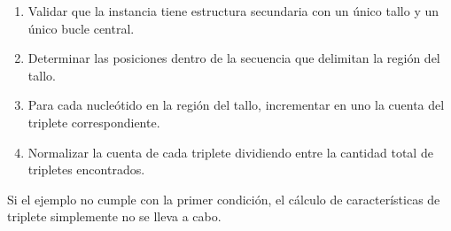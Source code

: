 \begin{enumerate}
\item Validar que la instancia tiene estructura secundaria con un
  único tallo y un único bucle central.
\item Determinar las posiciones dentro de la secuencia que delimitan
  la región del tallo.
\item Para cada nucleótido en la región del tallo, incrementar en uno
  la cuenta del triplete correspondiente.
\item Normalizar la cuenta de cada triplete dividiendo entre la
  cantidad total de tripletes encontrados.
\end{enumerate}
Si el ejemplo no cumple con la primer condición, el cálculo de
características de triplete simplemente no se lleva a cabo.
